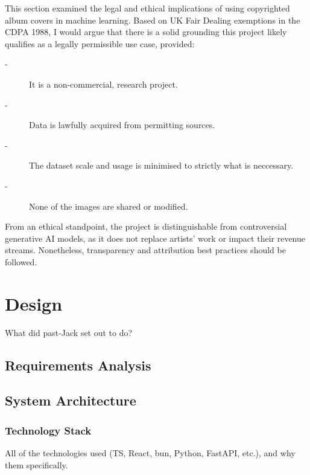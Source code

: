                   This section examined the legal and ethical implications of using copyrighted album covers in machine learning. Based on UK Fair Dealing exemptions in the CDPA 1988, I would argue that there is a solid grounding this project likely qualifies as a legally permissible use case, provided:
                  \begin{description}
                      \item[-] It is a non-commercial, research project.
                      \item[-] Data is lawfully acquired from permitting sources.
                      \item[-] The dataset scale and usage is minimised to strictly what is neccessary.
                      \item[-] None of the images are shared or modified. %
                  \end{description}
                  
                  From an ethical standpoint, the project is distinguishable from controversial generative AI models, as it does not replace artists’ work or impact their revenue streams. Nonetheless, transparency and attribution best practices should be followed.
  
  \section{Design} %
      What did past-Jack set out to do?
  
      \subsection{Requirements Analysis}
  
      \subsection{System Architecture} %
          \subsubsection{Technology Stack}
              All of the technologies used (TS, React, bun, Python, FastAPI, etc.), and why them specifically.
  
